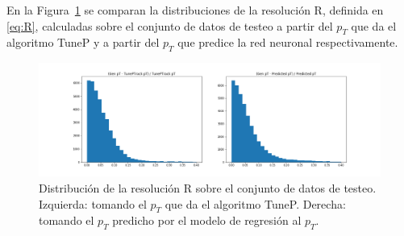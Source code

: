 En la Figura~\ref{fig:R_predicted} se comparan la distribuciones de la resoluci\'on R, definida en \eqref{eq:R}, calculadas sobre el conjunto de datos de testeo a partir del $p_{T}$ que da el algoritmo TuneP y a partir del $p_{T}$ que predice la red neuronal respectivamente.

\begin{figure}[h]
\centering
\includegraphics[width=1.0\textwidth]{figures/R_predicted.png}
\caption{Distribuci\'on de la resoluci\'on R sobre el conjunto de datos de testeo. Izquierda: tomando el $p_{T}$ que da el algoritmo TuneP. Derecha: tomando el $p_{T}$ predicho por el modelo de regresi\'on al $p_{T}$.}
\label{fig:R_predicted}        
\end{figure}

